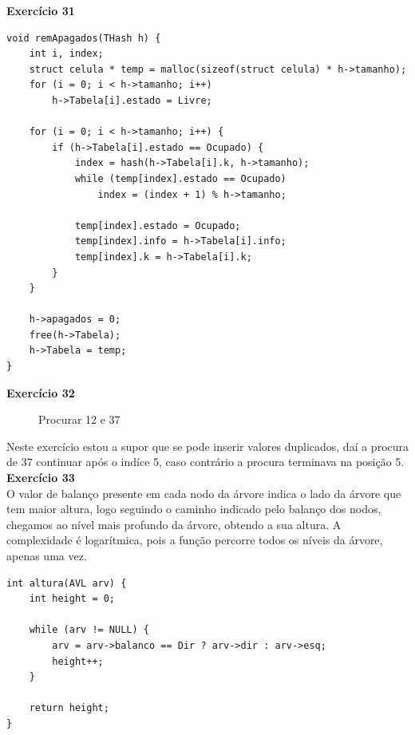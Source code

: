 \documentclass[a4paper,11pt]{article}
\begin{document}
\noindent \textbf{Exercício 31}

\begin{verbatim}
void remApagados(THash h) {
	int i, index;
	struct celula * temp = malloc(sizeof(struct celula) * h->tamanho);
	for (i = 0; i < h->tamanho; i++)
		h->Tabela[i].estado = Livre;
	
	for (i = 0; i < h->tamanho; i++) {
		if (h->Tabela[i].estado == Ocupado) {
			index = hash(h->Tabela[i].k, h->tamanho);
			while (temp[index].estado == Ocupado)
				index = (index + 1) % h->tamanho;
			
			temp[index].estado = Ocupado;
			temp[index].info = h->Tabela[i].info;
			temp[index].k = h->Tabela[i].k;
		}
	}
	
	h->apagados = 0;
	free(h->Tabela);
	h->Tabela = temp;
}
\end{verbatim}

\noindent \textbf{Exercício 32}

\begin{figure}[H]
	\centering
	\caption{Procurar 12 e 37}
\end{figure}

\noindent Neste exercício estou a supor que se pode inserir valores duplicados, daí a procura de 37 continuar após o indíce 5, caso contrário a procura terminava na posição 5.\\

\noindent \textbf{Exercício 33}\\

\noindent O valor de balanço presente em cada nodo da árvore indica o lado da árvore que tem maior altura, logo seguindo o caminho indicado pelo balanço dos nodos, chegamos ao nível mais profundo da árvore, obtendo a sua altura. A complexidade é logarítmica, pois a função percorre todos os níveis da árvore, apenas uma vez.

\begin{verbatim}
int altura(AVL arv) {
	int height = 0;
	
	while (arv != NULL) {
		arv = arv->balanco == Dir ? arv->dir : arv->esq;
		height++;
	}
	
	return height;
}
\end{verbatim}
\end{document}
